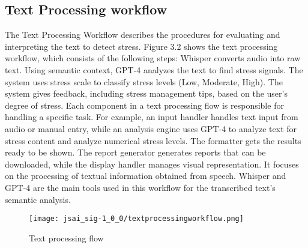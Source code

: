 \documentclass[a4j, twocolumn]{article}
\begin{document}
\subsection{Text Processing workflow}
The Text Processing Workflow describes the procedures for evaluating and interpreting the text to detect stress. Figure 3.2 shows the text processing workflow, which consists of the following steps: Whisper converts audio into raw text. Using semantic context, GPT-4 analyzes the text to find stress signals. The system uses stress scale to classify stress levels (Low, Moderate, High). The system gives feedback, including stress management tips, based on the user's degree of stress. Each component in a text processing flow is responsible for handling a specific task. For example, an input handler handles text input from audio or manual entry, while an analysis engine uses GPT-4 to analyze text for stress content and analyze numerical stress levels. The formatter gets the results ready to be shown. The report generator generates reports that can be downloaded, while the display handler manages visual representation. It focuses on the processing of textual information obtained from speech. Whisper and GPT-4 are the main tools used in this workflow for the transcribed text's semantic analysis.
\vspace{-5mm} %
\begin{figure}[H]
\centering
\texttt{[image: jsai\_sig-1\_0\_0/textprocessingworkflow.png]}
\caption{Text processing flow}
\label{fig:text flow}
\end{figure}
\end{document}
